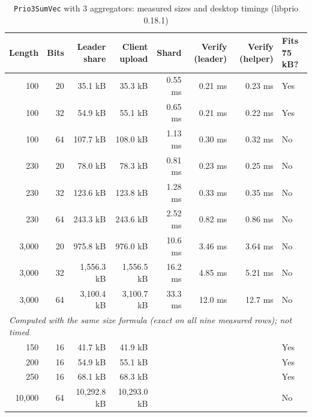 \documentclass[10pt,twoside,openany]{book}
\theoremstyle{dpepstyle}
\begin{document}
\begin{table}[htbp]
\centering
\caption{\texttt{Prio3SumVec} with 3 aggregators: measured sizes and desktop timings (libprio 0.18.1)}
\label{tab:prio3-bench}
\scriptsize
\setlength{\tabcolsep}{3pt}
\begin{tabular}{rrrrrrrl}
\toprule
\textbf{Length} & \textbf{Bits} & \textbf{Leader share} & \textbf{Client upload} & \textbf{Shard} & \textbf{Verify (leader)} & \textbf{Verify (helper)} & \textbf{Fits 75 kB?} \\
\midrule
100 & 20 & 35.1 kB & 35.3 kB & 0.55 ms & 0.21 ms & 0.23 ms & Yes \\
100 & 32 & 54.9 kB & 55.1 kB & 0.65 ms & 0.21 ms & 0.22 ms & Yes \\
100 & 64 & 107.7 kB & 108.0 kB & 1.13 ms & 0.30 ms & 0.32 ms & No \\
230 & 20 & 78.0 kB & 78.3 kB & 0.81 ms & 0.23 ms & 0.25 ms & No \\
230 & 32 & 123.6 kB & 123.8 kB & 1.28 ms & 0.33 ms & 0.35 ms & No \\
230 & 64 & 243.3 kB & 243.6 kB & 2.52 ms & 0.82 ms & 0.86 ms & No \\
3,000 & 20 & 975.8 kB & 976.0 kB & 10.6 ms & 3.46 ms & 3.64 ms & No \\
3,000 & 32 & 1,556.3 kB & 1,556.5 kB & 16.2 ms & 4.85 ms & 5.21 ms & No \\
3,000 & 64 & 3,100.4 kB & 3,100.7 kB & 33.3 ms & 12.0 ms & 12.7 ms & No \\
\midrule
\multicolumn{8}{l}{\emph{Computed with the same size formula (exact on all nine measured rows); not timed}} \\
150 & 16 & 41.7 kB & 41.9 kB & & & & Yes \\
200 & 16 & 54.9 kB & 55.1 kB & & & & Yes \\
250 & 16 & 68.1 kB & 68.3 kB & & & & Yes \\
10,000 & 64 & 10,292.8 kB & 10,293.0 kB & & & & No \\
\bottomrule
\end{tabular}
\par{}
\end{table}
\end{document}
